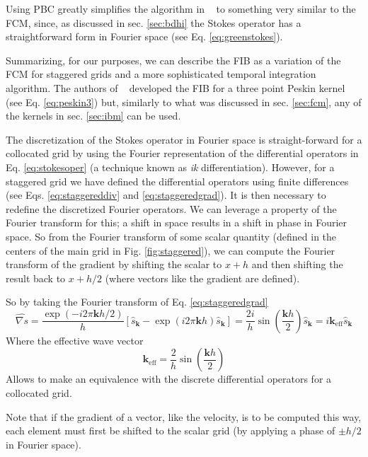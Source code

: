 \documentclass[ twoside,openright,titlepage,numbers=noenddot,%
headinclude,footinclude,cleardoublepage=empty,abstract=on,
BCOR=5mm,paper=b5,fontsize=11pt, dvipsnames
]{scrreprt}
\renewcommand{\vec}[1]{\bm{#1}}
\newcommand{\fou}[1]{\widehat{#1}}
\begin{document}
Using \gls{PBC} greatly simplifies the algorithm in ~\cite{Delong2014} to something very similar to the \gls{FCM}, since, as discussed in sec. \ref{sec:bdhi} the Stokes operator has a straightforward form in Fourier space (see Eq. \eqref{eq:greenstokes}).

Summarizing, for our purposes, we can describe the \gls{FIB} as a variation of the \gls{FCM} for staggered grids and a more sophisticated temporal integration algorithm. The authors of ~\cite{Delong2013} developed the \gls{FIB} for a three point Peskin kernel (see Eq. \eqref{eq:peskin3}) but, similarly to what was discussed in sec. \ref{sec:fcm}, any of the kernels in sec. \ref{sec:ibm} can be used.

The discretization of the Stokes operator in Fourier space is straight-forward for a collocated grid by using the Fourier representation of the differential operators in Eq. \eqref{eq:stokesoper} (a technique known as \emph{ik} differentiation). However, for a staggered grid we have defined the differential operators using finite differences (see Eqs. \eqref{eq:staggereddiv} and \eqref{eq:staggeredgrad}). It is then necessary to redefine the discretized Fourier operators. We can leverage a property of the Fourier transform for this; a shift in space results in a shift in phase in Fourier space. So from the Fourier transform of some scalar quantity (defined in the centers of the main grid in Fig. \ref{fig:staggered}), we can compute the Fourier transform of the gradient by shifting the scalar to $x+h$ and then shifting the result back to $x+h/2$ (where vectors like the gradient are defined).

So by taking the Fourier transform of Eq. \eqref{eq:staggeredgrad}
\begin{equation}
  \label{eq:staggeredgradfou}
  \fou{\nabla s} = \frac{\exp(-i2\pi \vec{k} h/2)}{h}\left[\fou{s}_{\vec{k}} - \exp(i2\pi \vec{k} h)\fou{s}_{\vec{k}}\right] = \frac{2i}{h}\sin\left(\frac{\vec{k} h}{2}\right)\fou{s}_{\vec{k}} = i\vec{k}_{\text{eff}}\fou{s}_{\vec{k}}
\end{equation}
Where the effective wave vector
\begin{equation}
  \vec{k}_{\text{eff}} = \frac{2}{h}\sin\left(\frac{\vec{k}h}{2}\right)
\end{equation}
Allows to make an equivalence with the discrete differential operators for a collocated grid.

Note that if the gradient of a vector, like the velocity, is to be computed this way, each element must first be shifted to the scalar grid (by applying a phase of $\pm h/2$ in Fourier space).
\end{document}
